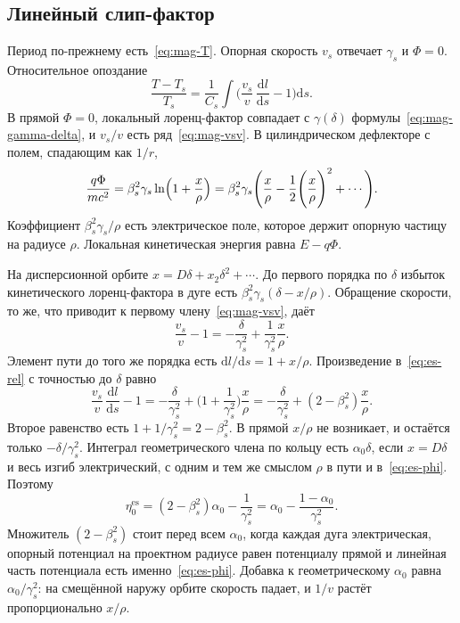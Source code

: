 \documentclass[aps,pra,preprint,a4paper,amsmath,amssymb,longbibliography]{revtex4-2}
\begin{document}
\subsection{Линейный слип-фактор}
\label{sec:es-eta0}

Период по-прежнему есть~\eqref{eq:mag-T}. Опорная скорость $v_s$ отвечает $\gamma_s$ и $\Phi=0$. Относительное опоздание
\begin{equation}
\label{eq:es-rel}
\frac{T-T_s}{T_s}
=\frac{1}{C_s}\int\Biggl(\frac{v_s}{v}\,\frac{\mathrm{d}l}{\mathrm{d}s}-1\Biggr)\mathrm{d}s.
\end{equation}
В прямой $\Phi=0$, локальный лоренц-фактор совпадает с $\gamma(\delta)$ формулы~\eqref{eq:mag-gamma-delta}, и $v_s/v$ есть ряд~\eqref{eq:mag-vsv}. В цилиндрическом дефлекторе с полем, спадающим как $1/r$,
\begin{equation}
\label{eq:es-phi}
\frac{q\Phi}{mc^2}
=\beta_s^2\gamma_s\ln\Bigl(1+\frac{x}{\rho}\Bigr)
=\beta_s^2\gamma_s\Biggl(\frac{x}{\rho}-\frac{1}{2}\Biggl(\frac{x}{\rho}\Biggr)^2+\cdots\Biggr).
\end{equation}
Коэффициент $\beta_s^2\gamma_s/\rho$ есть электрическое поле, которое держит опорную частицу на радиусе $\rho$. Локальная кинетическая энергия равна $E-q\Phi$.

На дисперсионной орбите $x=D\delta+x_2\delta^2+\cdots$. До первого порядка по $\delta$ избыток кинетического лоренц-фактора в дуге есть $\beta_s^2\gamma_s(\delta-x/\rho)$. Обращение скорости, то же, что приводит к первому члену~\eqref{eq:mag-vsv}, даёт
\begin{equation}
\label{eq:es-v-linear}
\frac{v_s}{v}-1
=-\frac{\delta}{\gamma_s^2}+\frac{1}{\gamma_s^2}\frac{x}{\rho}.
\end{equation}
Элемент пути до того же порядка есть $\mathrm{d}l/\mathrm{d}s=1+x/\rho$. Произведение в~\eqref{eq:es-rel} с точностью до $\delta$ равно
\begin{equation}
\label{eq:es-integrand}
\frac{v_s}{v}\,\frac{\mathrm{d}l}{\mathrm{d}s}-1
=-\frac{\delta}{\gamma_s^2}
+\Biggl(1+\frac{1}{\gamma_s^2}\Biggr)\frac{x}{\rho}
=-\frac{\delta}{\gamma_s^2}
+(2-\beta_s^2)\frac{x}{\rho}.
\end{equation}
Второе равенство есть $1+1/\gamma_s^2=2-\beta_s^2$. В прямой $x/\rho$ не возникает, и остаётся только $-\delta/\gamma_s^2$. Интеграл геометрического члена по кольцу есть $\alpha_0\delta$, если $x=D\delta$ и весь изгиб электрический, с одним и тем же смыслом $\rho$ в пути и в~\eqref{eq:es-phi}. Поэтому
\begin{equation}
\label{eq:es-eta0}
\eta_0^{\mathrm{es}}
=(2-\beta_s^2)\alpha_0-\frac{1}{\gamma_s^2}
=\alpha_0-\frac{1-\alpha_0}{\gamma_s^2}.
\end{equation}
Множитель $(2-\beta_s^2)$ стоит перед всем $\alpha_0$, когда каждая дуга электрическая, опорный потенциал на проектном радиусе равен потенциалу прямой и линейная часть потенциала есть именно~\eqref{eq:es-phi}. Добавка к геометрическому $\alpha_0$ равна $\alpha_0/\gamma_s^2$: на смещённой наружу орбите скорость падает, и $1/v$ растёт пропорционально $x/\rho$.
\end{document}
